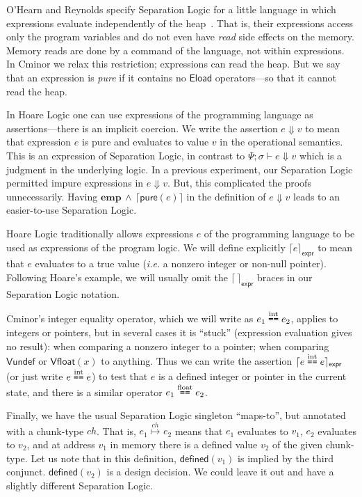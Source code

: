 \documentclass{llncs}
\newcommand{\cminor}{Cminor}
\newcommand{\tyface}[1]{\ensuremath{\mathsf{#1}}}
\newcommand{\Vundef}{\tyface{Vundef}}
\newcommand{\Vfloat}{\tyface{Vfloat}}
\newcommand{\fmap}{\Psi}
\newcommand{\evalexp}[3]{\fmap; #1 \vdash #2 \Downarrow #3}
\newcommand{\emp}{\ensuremath{\mathrm{\mathbf{emp}}}}
\newcommand{\assertprop}[1]{\lceil #1 \rceil}
\newcommand{\assertexpr}[1]{\lceil #1 \rceil_\tyface{expr}}
\newcommand{\assertmapsto}[4][]{#2\stackrel{#3}{\mapsto}_{#1}#4}
\newcommand{\assertdef}[1]{\mathsf{defined}(#1)}
\newcommand{\ceq}[3]{#2\stackrel{#1}{\mbox{\texttt{==}}}#3}
\newcommand{\ieq}[2]{\ceq{\mathrm{int}}{#1}{#2}}
\begin{document}
O'Hearn and Reynolds specify Separation Logic for a little
language in which expressions evaluate independently of the heap~\cite{ohearn01}.
That is, their expressions access only the program variables
and do not even have \emph{read} side effects on the memory.
Memory reads
are done by a command of the language, not within
expressions.  In \cminor{} we relax this restriction; expressions
can read the heap.  But we say that an expression is \emph{pure} if
it contains no \tyface{Eload} operators---so that it cannot read the heap.

In Hoare Logic one can use expressions of the programming language as
assertions---there is an implicit coercion.
We write the assertion $e\Downarrow v$ 
to mean that
expression $e$ is pure and evaluates to value $v$ in the operational semantics.
This is an expression of Separation Logic, in contrast to 
$\evalexp{\sigma}{e}{v}$ which is a judgment in the underlying
logic.
In a previous experiment, our Separation Logic permitted impure expressions
in $e\Downarrow v$. But, this complicated the proofs unnecessarily. Having 
$ \emp\,\wedge\,\assertprop{\tyface{pure}(e)}$ in the definition of $e\Downarrow v$
leads to an easier-to-use Separation Logic.

Hoare Logic traditionally allows expressions $e$ of the programming
language to be used as expressions of the program logic.
We will define explicitly
$\assertexpr{e}$ to mean that $e$ evaluates to a true value
(\textit{i.e.} a nonzero integer or non-null pointer).
Following Hoare's example, we will usually omit the $\assertexpr{\,}$
braces in our Separation Logic notation.

\cminor's integer equality operator,
which we will write as $\ieq{e_1}{e_2}$,
applies to integers or pointers, but in several cases it is
``stuck'' (expression evaluation gives no result):
when comparing a nonzero integer to a pointer;
when comparing
\Vundef{} or $\Vfloat{(x)}$ to anything.  Thus we can write
the assertion $\assertexpr{\ieq e e}$ (or just write $\ieq e e$) to test 
that $e$ is a defined integer or pointer in the current state,
and there is a similar operator $\ceq{\mathrm{float}}{e_1}{e_2}$.

Finally, we have the usual Separation Logic singleton ``maps-to'',
but annotated with a chunk-type $\mathit{ch}$.  That is,
$\assertmapsto{e_1}{\mathit{ch}}{e_2}$
means that $e_1$ evaluates to $v_1$, $e_2$ evaluates to $v_2$, and
at address $v_1$ in memory there is a defined value
$v_2$ of the given chunk-type.
Let us note that in this definition, $\assertdef{v_1}$ is implied by the third conjunct.
$\assertdef{v_2}$ is a design decision. We could leave it out and have a slightly different
Separation Logic.
\end{document}
